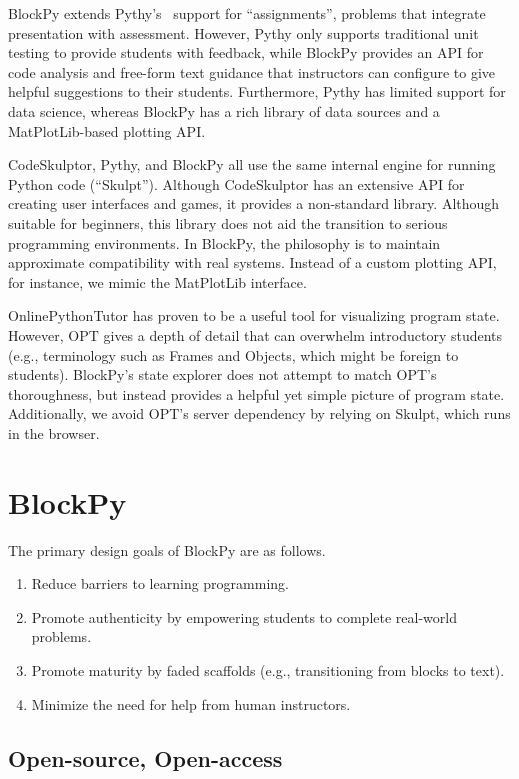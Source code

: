 \documentclass[10pt, conference, compsocconf]{IEEEtran}
\begin{document}
BlockPy extends Pythy's~\cite{pythy} support for ``assignments'', problems that integrate presentation with assessment.
However, Pythy only supports traditional unit testing to provide students with feedback, while BlockPy provides an API for code analysis and free-form text guidance that instructors can configure to give helpful suggestions to their students.
Furthermore, Pythy has limited support for data science, whereas BlockPy has a rich library of data sources and a MatPlotLib-based plotting API.

CodeSkulptor, Pythy, and BlockPy all use the same internal engine for running Python code (``Skulpt''). 
Although CodeSkulptor has an extensive API for creating user interfaces and games, it provides a non-standard library.
Although suitable for beginners, this library does not aid the transition to serious programming environments.
In BlockPy, the philosophy is to maintain approximate compatibility with real systems.
Instead of a custom plotting API, for instance, we mimic the MatPlotLib interface.

OnlinePythonTutor has proven to be a useful tool for visualizing program state.
However, OPT gives a depth of detail that can overwhelm introductory students (e.g., terminology such as Frames and Objects, which might be foreign to students).
BlockPy's state explorer does not attempt to match OPT's thoroughness, but instead provides a helpful yet simple picture of program state.
Additionally, we avoid OPT's server dependency by relying on Skulpt, which runs in the browser.

\section{BlockPy}

The primary design goals of BlockPy are as follows.

\begin{enumerate}
\item Reduce barriers to learning programming.
\item Promote authenticity by empowering students to complete real-world problems.
\item Promote maturity by faded scaffolds (e.g., transitioning from blocks to text).
\item Minimize the need for help from human instructors.
\end{enumerate}

\subsection{Open-source, Open-access}
\end{document}
